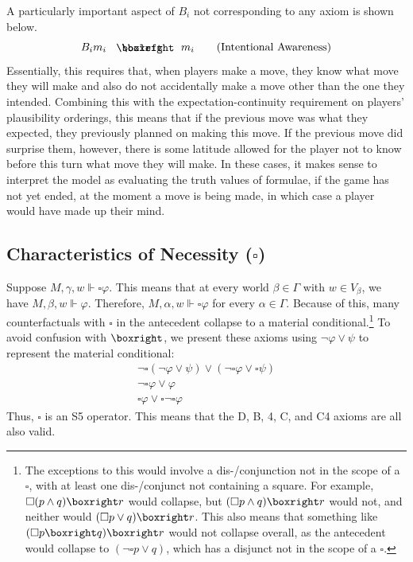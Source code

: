 \documentclass{article}
\begin{document}
A particularly important aspect of $B_i$ not corresponding to any axiom is shown below.
\begin{equation}
    B_im_i\boxiff m_i\tag{Intentional Awareness}
\end{equation}
Essentially, this requires that, when players make a move, they know what move they will make and also do not accidentally make a move other than the one they intended. Combining this with the expectation-continuity requirement on players' plausibility orderings, this means that if the previous move was what they expected, they previously planned on making this move. If the previous move did surprise them, however, there is some latitude allowed for the player not to know before this turn what move they will make. In these cases, it makes sense to interpret the model as evaluating the truth values of formulae, if the game has not yet ended, at the moment a move is being made, in which case a player would have made up their mind.
\subsection{Characteristics of Necessity ($\square$)}
Suppose $M,\gamma,w\Vdash\square\varphi$. This means that at every world $\beta\in\Gamma$ with $w\in V_{\beta}$, we have $M,\beta,w\Vdash\varphi$. Therefore, $M,\alpha,w\Vdash\square\varphi$ for every $\alpha\in\Gamma$. Because of this, many counterfactuals with $\square$ in the antecedent collapse to a material conditional.\footnote{The exceptions to this would involve a dis-/conjunction not in the scope of a $\square$, with at least one dis-/conjunct not containing a square. For example, $\square(p\land q)\boxright r$ would collapse, but $(\square p\land q)\boxright r$ would not, and neither would $(\square p\lor q)\boxright r$. This also means that something like $(\square p\boxright q)\boxright r$ would not collapse overall, as the antecedent would collapse to $(\lnot\square p\lor q)$, which has a disjunct not in the scope of a $\square$.} To avoid confusion with $\boxright$, we present these axioms using $\lnot\varphi\lor\psi$ to represent the material conditional:
\begin{gather}
    \lnot\square(\lnot\varphi\lor\psi)\lor(\lnot\square\varphi\lor\square\psi)\tag{K}\\
    \lnot\square\varphi\lor\varphi\tag{T}\\
    \square\varphi\lor\square\lnot\square\varphi\tag{5}
\end{gather}
Thus, $\square$ is an S5 operator. This means that the D, B, 4, C, and C4 axioms are all also valid.
\end{document}
